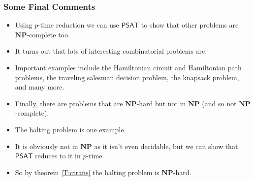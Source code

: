 \documentclass[handout]{beamer}
\newcommand{\NP}{\mathbf{NP}}
\newcommand{\SAT}{\mathsf{PSAT}}
\begin{document}
\begin{frame}
\frametitle{Some Final Comments}
\begin{itemize}
\item Using $p$-time reduction we can use $\SAT$ to show that other problems are $\NP$-complete too. 
\vspace{0.2cm}
\item It turns out that lots of interesting combinatorial problems are.
\vspace{0.2cm} 
\item Important examples include the Hamiltonian circuit and Hamiltonian path problems, the traveling salesman decision problem, the knapsack problem, and many more.
\vspace{0.2cm}
\item Finally, there are problems that are $\NP$-hard but not in $\NP$ (and so not $\NP$-complete). 
\vspace{0.2cm}
\item The halting problem is one example. 
\vspace{0.2cm}
\item It is obviously not in $\NP$ as it isn't even decidable, but we can show that $\SAT$ reduces to it in $p$-time. 
\vspace{0.2cm}
\item So by theorem \ref{T:ctrans} the halting problem is $\NP$-hard.  
\end{itemize} 
\end{frame}
\end{document}
